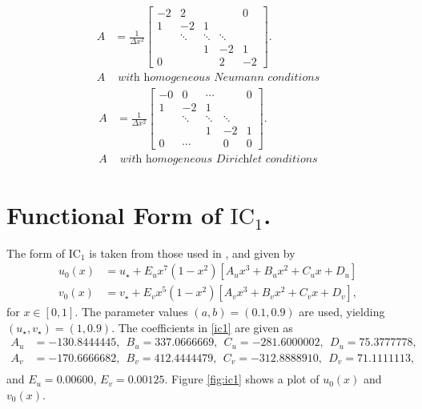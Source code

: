 \begin{multicols}{2}
\begin{equation}\label{Aneumann}
    \begin{split}
A&=\frac{1}{\Delta x^2}\begin{bmatrix}
   -2&  2&  &  & 0\\
   1&  -2&  1&  & \\
   &  \ddots&  \ddots&  \ddots& \\
   &  &  1&  -2& 1\\
   0&  &  &  2& -2
  \end{bmatrix}.\\
  A &\textit{ with homogeneous Neumann conditions}
    \end{split}
\end{equation}
\break
\begin{equation}\label{Adirichlet}
    \begin{split}
A&=\frac{1}{\Delta x^2}\begin{bmatrix}
   -0&  0& \cdots &  & 0\\
   1&  -2&  1&  & \\
   &  \ddots&  \ddots&  \ddots& \\
   &  &  1&  -2& 1\\
   0&\cdots  &  &  0& 0
  \end{bmatrix}.\\
  A & \textit{ with homogeneous Dirichlet conditions}
    \end{split}
\end{equation}
\end{multicols}


\section{Functional Form of $\text{IC}_1$.}
The form of $\text{IC}_1$ is taken from those used in \cite{gaffmonk}, and given by
\begin{equation}\label{ic1}
    \begin{split}
    u_0(x)&=u_\star+E_ux^7(1-x^2)[A_ux^3+B_ux^2+C_ux+D_u]\\
    v_0(x)&=v_\star+E_vx^5(1-x^2)[A_vx^3+B_vx^2+C_vx+D_v],
    \end{split}
\end{equation}
for $x\in[0,1]$. The parameter values $(a,b)=(0.1,0.9)$ are used, yielding $(u_\star,v_\star)=(1,0.9)$. The coefficients in \eqref{ic1} are given as
\begin{align*}
A_u&=-130.8444445,\ \ B_u=337.0666669,\ \ C_u=-281.6000002,\ \ D_u=75.3777778,\\
A_v&=-170.6666682,\ \ B_v=412.4444479,\ \ C_v=-312.8888910,\ \ D_v=71.1111113,\\
\end{align*}
and $E_u=0.00600$, $E_v=0.00125$. Figure \ref{fig:ic1} shows a plot of $u_0(x)$ and $v_0(x)$.

